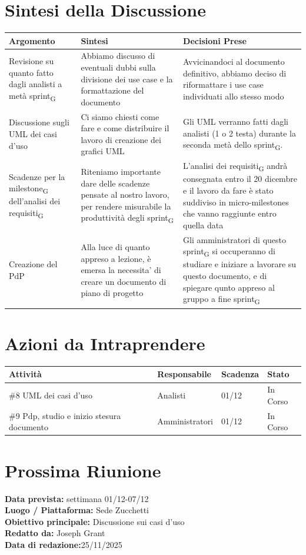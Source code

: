 \documentclass[a4paper,12pt]{article}
\newcommand{\gls}[1]{#1\textsubscript{G}}
\begin{document}
\section*{ Sintesi della Discussione}

\begin{longtable}{|p{}|p{}|p{}|}
\hline
\textbf{Argomento} & \textbf{Sintesi} & \textbf{Decisioni Prese} \\ \hline
 Revisione su quanto fatto dagli analisti a metà \gls{sprint}&Abbiamo discusso di eventuali dubbi sulla divisione dei use case e la formattazione del documento&Avvicinandoci al documento definitivo, abbiamo deciso di riformattare i use case individuati allo stesso modo   \\ \hline

 Discussione sugli UML dei casi d'uso&Ci siamo chiesti come fare e come distribuire il lavoro di creazione dei grafici UML&Gli UML verranno fatti dagli analisti (1 o 2  testa) durante la seconda metà dello \gls{sprint}.   \\ \hline

Scadenze per la \gls{milestone} dell'\gls{analisi dei requisiti}&Riteniamo importante dare delle scadenze pensate al nostro lavoro, per rendere misurabile la produttività degli \gls{sprint}&L'\gls{analisi dei requisiti} andrà consegnata entro il 20 dicembre e il lavoro da fare è stato suddiviso in micro-milestones che vanno raggiunte entro quella data \\ \hline

Creazione del PdP&Alla luce di quanto appreso a lezione, è emersa la necessita' di creare un documento di piano di progetto&Gli amministratori di questo \gls{sprint} si occuperanno di studiare e iniziare a lavorare su questo documento, e di spiegare qunto appreso al gruppo a fine \gls{sprint} \\ \hline


 
 
\end{longtable}


\section*{ Azioni da Intraprendere}

\begin{longtable}{|p{}|p{}|p{}|p{}|}
\hline
\textbf{Attività} & \textbf{Responsabile} & \textbf{Scadenza} & \textbf{Stato} \\ \hline
\#8 UML dei casi d'uso&Analisti  &01/12  &In Corso  \\ \hline
\#9 Pdp, studio e inizio stesura documento &Amministratori  &01/12  &In Corso  \\ \hline
\end{longtable}


\section*{ Prossima Riunione}
\textbf{Data prevista:} settimana 01/12-07/12  \\
\textbf{Luogo / Piattaforma:} Sede Zucchetti \\
\textbf{Obiettivo principale:} Discussione sui casi d'uso\\


\textbf{Redatto da:} Joseph Grant \\
\textbf{Data di redazione:}25/11/2025
\end{document}
